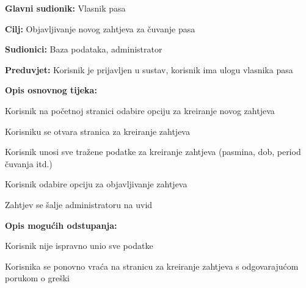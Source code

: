 					\noindent {}
					\begin{packed_item}
						
						\item \textbf{Glavni sudionik: } Vlasnik pasa
						\item  \textbf{Cilj:} Objavljivanje novog zahtjeva za čuvanje pasa
						\item  \textbf{Sudionici:} Baza podataka, administrator
						\item  \textbf{Preduvjet:} Korisnik je prijavljen u sustav, korisnik ima ulogu vlasnika pasa
						\item  \textbf{Opis osnovnog tijeka:}
						
						\item[] \begin{packed_enum}
							
							\item Korisnik na početnoj stranici odabire opciju za kreiranje novog zahtjeva   
							\item Korisniku se otvara stranica za kreiranje zahtjeva
							\item Korisnik unosi sve tražene podatke za kreiranje zahtjeva (pasmina, dob, period čuvanja itd.)
							\item Korisnik odabire opciju za objavljivanje zahtjeva
							\item Zahtjev se šalje administratoru na uvid
							
						\end{packed_enum}
						
						\item  \textbf{Opis mogućih odstupanja:}
						
						\item[] \begin{packed_item}
							
							\item[4.a] Korisnik nije ispravno unio sve podatke
							\item[] \begin{packed_enum}
								
								\item Korisnika se ponovno vraća na stranicu za kreiranje zahtjeva s odgovarajućom porukom o greški 
								
							\end{packed_enum}
						\end{packed_item}
					\end{packed_item}		
				
